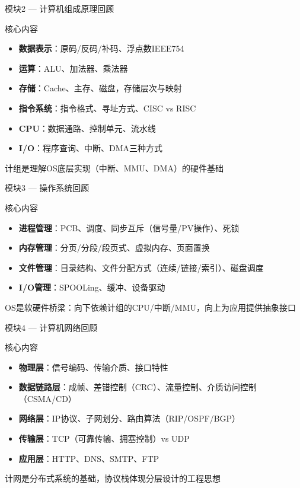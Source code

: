 \documentclass[10pt, aspectratio=169]{beamer}
\begin{document}
\begin{frame}{模块2 --- 计算机组成原理回顾}
    \begin{block}{核心内容}
        \begin{itemize}
            \item \textbf{数据表示}：原码/反码/补码、浮点数IEEE754
            \item \textbf{运算}：ALU、加法器、乘法器
            \item \textbf{存储}：Cache、主存、磁盘，存储层次与映射
            \item \textbf{指令系统}：指令格式、寻址方式、CISC vs RISC
            \item \textbf{CPU}：数据通路、控制单元、流水线
            \item \textbf{I/O}：程序查询、中断、DMA三种方式
        \end{itemize}
    \end{block}
    \vspace{0.3em}
    \alert{计组是理解OS底层实现（中断、MMU、DMA）的硬件基础}
\end{frame}

\begin{frame}{模块3 --- 操作系统回顾}
    \begin{block}{核心内容}
        \begin{itemize}
            \item \textbf{进程管理}：PCB、调度、同步互斥（信号量/PV操作）、死锁
            \item \textbf{内存管理}：分页/分段/段页式、虚拟内存、页面置换
            \item \textbf{文件管理}：目录结构、文件分配方式（连续/链接/索引）、磁盘调度
            \item \textbf{I/O管理}：SPOOLing、缓冲、设备驱动
        \end{itemize}
    \end{block}
    \vspace{0.3em}
    \alert{OS是软硬件桥梁：向下依赖计组的CPU/中断/MMU，向上为应用提供抽象接口}
\end{frame}

\begin{frame}{模块4 --- 计算机网络回顾}
    \begin{block}{核心内容}
        \begin{itemize}
            \item \textbf{物理层}：信号编码、传输介质、接口特性
            \item \textbf{数据链路层}：成帧、差错控制（CRC）、流量控制、介质访问控制（CSMA/CD）
            \item \textbf{网络层}：IP协议、子网划分、路由算法（RIP/OSPF/BGP）
            \item \textbf{传输层}：TCP（可靠传输、拥塞控制）vs UDP
            \item \textbf{应用层}：HTTP、DNS、SMTP、FTP
        \end{itemize}
    \end{block}
    \vspace{0.3em}
    \alert{计网是分布式系统的基础，协议栈体现分层设计的工程思想}
\end{frame}
\end{document}
